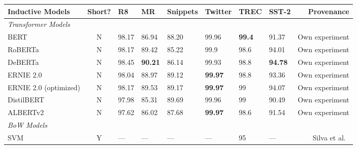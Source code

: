 \documentclass[runningheads]{llncs}
\begin{document}
\begin{table*}[!ht]
\begin{threeparttable}
{\begin{tabular}{lcllllllr}
            \toprule
            \textbf{Inductive Models}               & \textbf{Short?} & \textbf{R8}      & \textbf{MR}    & \textbf{Snippets}           & \textbf{Twitter} & \textbf{TREC} & \textbf{SST-2} & \textbf{Provenance}\\
            \midrule
            \emph{Transformer Models} \\
            BERT                                    & N                   & 98.17\tnote{$1$} & 86.94          & 88.20                             & 99.96            & \textbf{99.4} & 91.37          & Own experiment                  \\
            RoBERTa                                 & N                   & 98.17\tnote{$1$} & 89.42          & 85.22                             & 99.9             & 98.6          & 94.01          & Own experiment                  \\
            DeBERTa                                 & N                   & 98.45\tnote{$1$} & \textbf{90.21} & 86.14                             & 99.93            & 98.8          & \textbf{94.78} & Own experiment                  \\
            ERNIE 2.0                               & N                   & 98.04\tnote{$1$} & 88.97          & 89.12                             & \textbf{99.97}   & 98.8          & 93.36          & Own experiment                  \\
            ERNIE 2.0 (optimized)                   & N                   & 98.17\tnote{$1$} & 89.53          & 89.17                             & \textbf{99.97}   & 99            & 94.07          & Own experiment                  \\
            DistilBERT                              & N                   & 97.98\tnote{$1$} & 85.31          & 89.69                             & 99.96            & 99            & 90.49          & Own experiment                  \\
            ALBERTv2                                & N                   & 97.62            & 86.02          & 87.68                             & \textbf{99.97}   & 98.6          & 91.54          & Own experiment                  \\
            \midrule
            \emph{BoW Models} \\
            SVM     & Y & --- & --- & --- & --- & 95\tnote{$6$} & --- & Silva et al.~\cite{DBLP:journals/air/SilvaCMW11} \\


\end{tabular}}
\end{threeparttable}
\end{table*}
\end{document}

